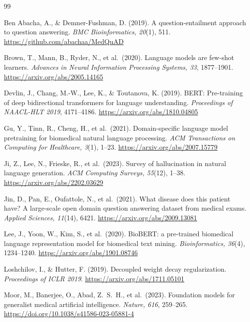 \documentclass[11pt,a4paper]{article}
\begin{document}

\begin{thebibliography}{99}

Ben Abacha, A., \& Demner-Fushman, D. (2019).
A question-entailment approach to question answering.
\textit{BMC Bioinformatics, 20}(1), 511.
\url{https://github.com/abachaa/MedQuAD}

Brown, T., Mann, B., Ryder, N., et al.\ (2020).
Language models are few-shot learners.
\textit{Advances in Neural Information Processing Systems, 33}, 1877--1901.
\url{https://arxiv.org/abs/2005.14165}

Devlin, J., Chang, M.-W., Lee, K., \& Toutanova, K. (2019).
BERT: Pre-training of deep bidirectional transformers for language understanding.
\textit{Proceedings of NAACL-HLT 2019}, 4171--4186.
\url{https://arxiv.org/abs/1810.04805}

Gu, Y., Tinn, R., Cheng, H., et al.\ (2021).
Domain-specific language model pretraining for biomedical natural language processing.
\textit{ACM Transactions on Computing for Healthcare, 3}(1), 1--23.
\url{https://arxiv.org/abs/2007.15779}

Ji, Z., Lee, N., Frieske, R., et al.\ (2023).
Survey of hallucination in natural language generation.
\textit{ACM Computing Surveys, 55}(12), 1--38.
\url{https://arxiv.org/abs/2202.03629}

Jin, D., Pan, E., Oufattole, N., et al.\ (2021).
What disease does this patient have? A large-scale open domain question answering dataset from medical exams.
\textit{Applied Sciences, 11}(14), 6421.
\url{https://arxiv.org/abs/2009.13081}

Lee, J., Yoon, W., Kim, S., et al.\ (2020).
BioBERT: a pre-trained biomedical language representation model for biomedical text mining.
\textit{Bioinformatics, 36}(4), 1234--1240.
\url{https://arxiv.org/abs/1901.08746}

Loshchilov, I., \& Hutter, F. (2019).
Decoupled weight decay regularization.
\textit{Proceedings of ICLR 2019}.
\url{https://arxiv.org/abs/1711.05101}

Moor, M., Banerjee, O., Abad, Z.\ S.\ H., et al.\ (2023).
Foundation models for generalist medical artificial intelligence.
\textit{Nature, 616}, 259--265.
\url{https://doi.org/10.1038/s41586-023-05881-4}


\end{thebibliography}
\end{document}

